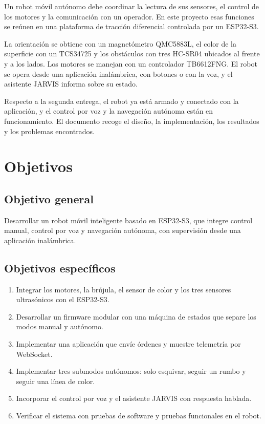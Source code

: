 \documentclass[journal]{IEEEtran}
\begin{document}
Un robot móvil autónomo debe coordinar la lectura de sus sensores, el control de los motores y la comunicación con un operador. En este proyecto esas funciones se reúnen en una plataforma de tracción diferencial controlada por un ESP32-S3.

La orientación se obtiene con un magnetómetro QMC5883L, el color de la superficie con un TCS34725 y los obstáculos con tres HC-SR04 ubicados al frente y a los lados. Los motores se manejan con un controlador TB6612FNG. El robot se opera desde una aplicación inalámbrica, con botones o con la voz, y el asistente JARVIS informa sobre su estado.

Respecto a la segunda entrega, el robot ya está armado y conectado con la aplicación, y el control por voz y la navegación autónoma están en funcionamiento. El documento recoge el diseño, la implementación, los resultados y los problemas encontrados.

\section{Objetivos}

\subsection{Objetivo general}

Desarrollar un robot móvil inteligente basado en ESP32-S3, que integre control manual, control por voz y navegación autónoma, con supervisión desde una aplicación inalámbrica.

\subsection{Objetivos específicos}

\begin{enumerate}[1.]
    \item Integrar los motores, la brújula, el sensor de color y los tres sensores ultrasónicos con el ESP32-S3.
    \item Desarrollar un firmware modular con una máquina de estados que separe los modos manual y autónomo.
    \item Implementar una aplicación que envíe órdenes y muestre telemetría por WebSocket.
    \item Implementar tres submodos autónomos: solo esquivar, seguir un rumbo y seguir una línea de color.
    \item Incorporar el control por voz y el asistente JARVIS con respuesta hablada.
    \item Verificar el sistema con pruebas de software y pruebas funcionales en el robot.
\end{enumerate}
\end{document}
